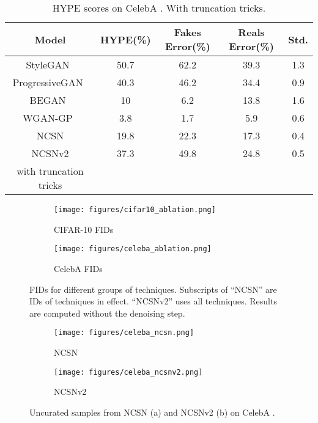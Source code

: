 \documentclass{article}
\begin{document}
\begin{table}[H]
    \caption{HYPE scores on CelebA . With truncation tricks. }\label{tab:full_hype}
    \begin{center}
    \begin{tabular}{ccccc}
        \toprule
        Model & HYPE(\%) & Fakes Error(\%) & Reals Error(\%) & Std. \\ 
        \midrule
        StyleGAN~\cite{karras2019style} & 50.7 & 62.2 & 39.3 & 1.3\\
        ProgressiveGAN~\cite{karras2017progressive} & 40.3 & 46.2 & 34.4 & 0.9\\
        BEGAN~\cite{berthelot2017began} & 10 & 6.2 & 13.8 & 1.6\\
        WGAN-GP~\cite{gulrajani2017improved} & 3.8 & 1.7 & 5.9 & 0.6\\
        \midrule
        NCSN & 19.8 & 22.3 & 17.3 & 0.4\\
        NCSNv2 & 37.3 & 49.8 & 24.8 & 0.5\\
        \bottomrule\bigstrut
    {\footnotesize  with truncation tricks}
    \end{tabular}
    \end{center}
\end{table}

\begin{figure}
    \centering
    \begin{minipage}{0.48\textwidth}
        \centering
            \begin{subfigure}[b]{0.5\textwidth}
            \texttt{[image: figures/cifar10\_ablation.png]}
            \caption{CIFAR-10 FIDs}\label{fig:fid_cifar10_no_denoising}
        \end{subfigure}\begin{subfigure}[b]{0.5\textwidth}
            \texttt{[image: figures/celeba\_ablation.png]}
            \caption{CelebA FIDs}\label{fig:fid_celeba_no_denoising}
        \end{subfigure}
        \caption{FIDs for different groups of techniques. Subscripts of ``NCSN'' are IDs of techniques in effect. ``NCSNv2'' uses all techniques. Results are computed without the denoising step.}
        \label{fig:ablation_no_denoising}
    \end{minipage}\hfill
    \begin{minipage}{0.45\textwidth}
        \centering
        \begin{subfigure}[b]{0.45\textwidth}
            \texttt{[image: figures/celeba\_ncsn.png]}
            \caption{NCSN}\label{fig:celeba_ncsn_no_denoising}
        \end{subfigure}
        \begin{subfigure}[b]{0.45\textwidth}
            \texttt{[image: figures/celeba\_ncsnv2.png]}
            \caption{NCSNv2}\label{fig:celeba_ncsnv2_no_denoising}
        \end{subfigure}
        \caption{Uncurated samples from NCSN (a) and NCSNv2 (b) on CelebA .}
    \end{minipage}
\end{figure}
\end{document}
